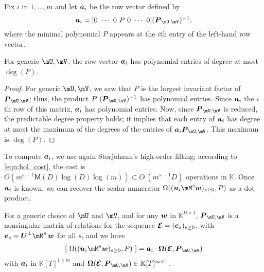 \documentclass[12pt]{article}
\newcommand{\var}{T} %
\newcommand{\mat}[1]{\bm{\MakeUppercase{#1}}} %
\newcommand{\row}[1]{\bm{\MakeLowercase{#1}}} %
\newcommand{\col}[1]{\bm{\MakeLowercase{#1}}} %
\newcommand{\softO}[1]{O{\tilde{~}}(#1)} %
\newcommand{\minpoly}{P}
\def\M {\ensuremath{\mathsf{M}}}
\def\K{\mathbb{K}}
\def\K {\ensuremath{\mathbb{K}}}
\begin{document}
Fix $i$ in $1,\dots,m$ and let $\row{a}_i$ be the row vector defined
by $$\row{a}_i =[0~\cdots~0~\minpoly~0~\cdots~0]  (\mat{P}_{\mU,\mV})^{-1} ,$$
where the minimal polynomial $\minpoly$ appears at the $i$th entry  of the
left-hand row vector. 
\begin{lemma}\label{utilde}
  For generic $\mU,\mV$, the row vector $\row{a}_i$ has polynomial
  entries of degree at most~$\deg(P)$.
\end{lemma}
\begin{proof}
  For generic $\mU,\mV$, we saw that $\minpoly$ is the largest invariant factor
  of $ \mat{P}_{\mU,\mV}$; thus, the product $\minpoly\
  (\mat{P}_{\mU,\mV})^{-1}$ has polynomial entries. Since $\row{a}_i$ the $i$th
  row of this matrix, $\row{a}_i$ has polynomial entries.  Now, since
  $\mat{P}_{\mU,\mV}$ is reduced, the predictable degree property
  \cite[Theorem~6.3-13]{Kailath80} holds; it implies that each entry of
  $\row{a}_i$ has degree at most the maximum of the degrees of the entries of
  $\row{a}_i\mat{P}_{\mU,\mV}$. This maximum is $\deg(\minpoly)$.
\end{proof}
To compute $\row{a}_i$, we use again Storjohann's high-order lifting;
according to \cref{eqn:hol_cost}, the cost is
$ O(m^{\omega-1} \M(D) \log(D) \log(m)) \subset \softO{m^{\omega-1}D}$ operations in $\K$.
Once $\row{a}_i$ is known, we can recover the scalar numerator
$\Omega((\row{u}_i \mM^s \col{w})_{s \ge 0}, \minpoly)$ as
a dot product. 
\begin{lemma}\label{lemma:omegaOmega}
  For a generic choice of $\mU$ and $\mV$, and for any $\col{w}$ in
  $\K^{D \times 1}$, $ \mat{P}_{\mU,\mV}$ is a nonsingular matrix of
  relations for the sequence $\mat{\mathcal{E}} =
  (\col{e}_s)_{s\ge0}$, with $\col{e}_s=\mat{U}^\perp \mM^s\, \col{w}$
  for all $s$, and we have
\begin{align}\label{eq:OmegaOmega}
[~\Omega((\row{u}_i \mM^s \col{w})_{s \ge 0}, \minpoly)~] = \row{a}_i\cdot \mat{\Omega}(\mat{\mathcal{E}}, \mat{P}_{\mU,\mV})
\end{align}
with $\row{a}_i$ in $\K[\var]^{1 \times m}$ and 
$\mat{\Omega}(\mat{\mathcal{E}} , \mat{P}_{\mU,\mV}) \in \K[\var]^{m \times 1}$.
\end{lemma}
\end{document}
